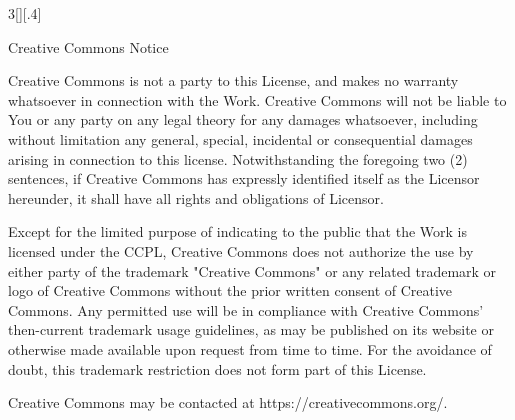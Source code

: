 \documentclass[8pt,a4paper]{article}
\begin{document}
\begin{multicols}{3}[][.4\paperwidth]
\begin{enumerate}
\begin{enumerate}
 \end{enumerate}

\end{enumerate}  

  Creative Commons Notice

  \smallskip
 
  Creative Commons is not a party to this License, and makes no warranty
  whatsoever in connection with the Work. Creative Commons will not be
  liable to You or any party on any legal theory for any damages
  whatsoever, including without limitation any general, special,
  incidental or consequential damages arising in connection to this
  license. Notwithstanding the foregoing two (2) sentences, if Creative
  Commons has expressly identified itself as the Licensor hereunder, it
  shall have all rights and obligations of Licensor.

  \smallskip
  
  Except for the limited purpose of indicating to the public that the
  Work is licensed under the CCPL, Creative Commons does not authorize
  the use by either party of the trademark "Creative Commons" or any
  related trademark or logo of Creative Commons without the prior
  written consent of Creative Commons. Any permitted use will be in
  compliance with Creative Commons' then-current trademark usage
  guidelines, as may be published on its website or otherwise made
  available upon request from time to time. For the avoidance of doubt,
  this trademark restriction does not form part of this License.
  
  \smallskip

  Creative Commons may be contacted at https://creativecommons.org/.

\end{multicols}
\end{document}
